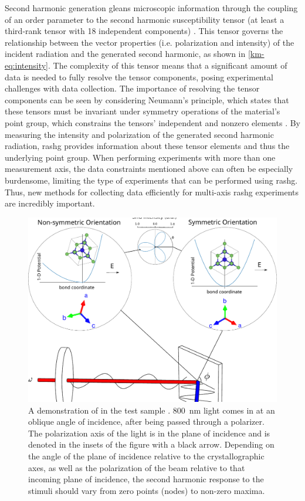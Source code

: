 Second harmonic generation gleans microscopic information through the coupling of an order parameter to the second harmonic susceptibility tensor (at least a third-rank tensor with 18 independent components) \citep{Boyd1992NonlinearOptics}. 
This tensor governs the relationship between the vector properties (i.e. polarization and intensity) of the incident radiation and the generated second harmonic, as shown in \cref{km-eq:intensity}.
The complexity of this tensor means that a significant amount of data is needed to fully resolve the tensor components, posing experimental challenges with data collection.
The importance of resolving the tensor components can be seen by considering Neumann's principle, which states that these tensors must be invariant under symmetry operations of the material's point group, which constrains the tensors' independent and nonzero elements \citep{Birss1966SymmetryMagnetism}. 
By measuring the intensity and polarization of the generated second harmonic radiation, \gls{rashg} provides information about these tensor elements and thus the underlying point group.
When performing experiments with more than one measurement axis, the data constraints mentioned above can often be especially burdensome, limiting the type of experiments that can be performed using \gls{rashg}.
Thus, new methods for collecting data efficiently for multi-axis \gls{rashg} experiments are incredibly important.

\begin{figure}
\centering
\includegraphics[width=\textwidth]{gfx/ch4/km-fig1.pdf}
\caption[A demonstration of  in the test sample ]{A demonstration of  in the test sample .
\qty{800}{nm} light comes in at an oblique angle of incidence, after being passed through a polarizer.
The polarization axis of the light is in the plane of incidence and is denoted in the insets of the figure with a black arrow.
Depending on the angle of the plane of incidence relative to the crystallographic axes, as well as the polarization of the beam relative to that incoming plane of incidence, the second harmonic response to the stimuli should vary from zero points (nodes) to non-zero maxima.}
\label{km-fig:1}
\end{figure}

